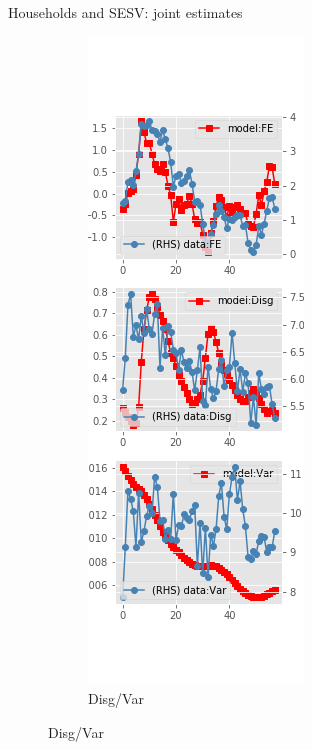 \documentclass{beamer}
\begin{document}
\begin{frame}{Households and SESV: joint estimates}
	\begin{figure}[ht]
		\label{SESV_diag_joint_SCE}
		\begin{subfigure}[b]{0.2\textwidth}
			\centering
			\caption{Disg/Var}
			\includegraphics[width=\textwidth, height = 0.8\textheight]{figuresDraft/sce_se_est_sv_joint_diag0.png}

\end{subfigure}
\end{figure}
\end{frame}
\end{document}
